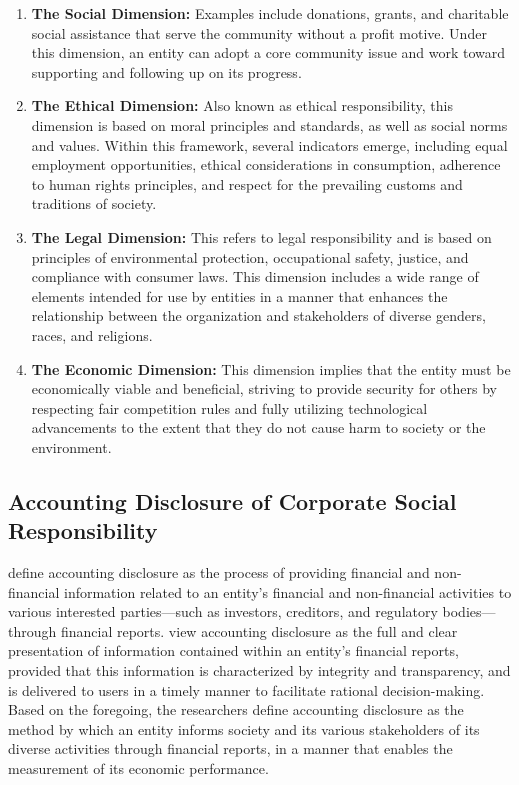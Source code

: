 \documentclass[10pt]{NSP1}
\begin{document}
\begin{enumerate}
    \item \textbf{The Social Dimension:} Examples include donations, grants, and charitable social assistance that serve the community without a profit motive. Under this dimension, an entity can adopt a core community issue and work toward supporting and following up on its progress.
    \item \textbf{The Ethical Dimension:} Also known as ethical responsibility, this dimension is based on moral principles and standards, as well as social norms and values. Within this framework, several indicators emerge, including equal employment opportunities, ethical considerations in consumption, adherence to human rights principles, and respect for the prevailing customs and traditions of society.
    \item \textbf{The Legal Dimension:} This refers to legal responsibility and is based on principles of environmental protection, occupational safety, justice, and compliance with consumer laws. This dimension includes a wide range of elements intended for use by entities in a manner that enhances the relationship between the organization and stakeholders of diverse genders, races, and religions.
    \item \textbf{The Economic Dimension:} This dimension implies that the entity must be economically viable and beneficial, striving to provide security for others by respecting fair competition rules and fully utilizing technological advancements to the extent that they do not cause harm to society or the environment.
\end{enumerate}

\subsection{Accounting Disclosure of Corporate Social Responsibility}

\cite{Blankespoor2020, Qatati2013} define accounting disclosure as the process of providing financial and non-financial information related to an entity's financial and non-financial activities to various interested parties—such as investors, creditors, and regulatory bodies—through financial reports. \cite{Malak2023} view accounting disclosure as the full and clear presentation of information contained within an entity's financial reports, provided that this information is characterized by integrity and transparency, and is delivered to users in a timely manner to facilitate rational decision-making. Based on the foregoing, the researchers define accounting disclosure as the method by which an entity informs society and its various stakeholders of its diverse activities through financial reports, in a manner that enables the measurement of its economic performance.
\end{document}
